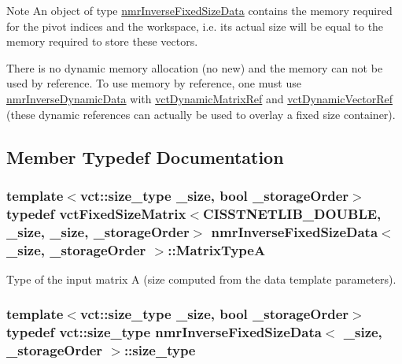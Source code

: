 \begin{DoxyNote}{Note}
An object of type \hyperlink{classnmr_inverse_fixed_size_data}{nmr\+Inverse\+Fixed\+Size\+Data} contains the memory required for the pivot indices and the workspace, i.\+e. its actual size will be equal to the memory required to store these vectors.

There is no dynamic memory allocation (no {\ttfamily new}) and the memory can not be used by reference. To use memory by reference, one must use \hyperlink{classnmr_inverse_dynamic_data}{nmr\+Inverse\+Dynamic\+Data} with \hyperlink{classvct_dynamic_matrix_ref}{vct\+Dynamic\+Matrix\+Ref} and \hyperlink{classvct_dynamic_vector_ref}{vct\+Dynamic\+Vector\+Ref} (these dynamic references can actually be used to overlay a fixed size container). 
\end{DoxyNote}


\subsection{Member Typedef Documentation}
\hypertarget{classnmr_inverse_fixed_size_data_a3ead3c2c221bc42f4717cb0cc0aaa876}{}
\subsubsection[{Matrix\+Type\+A}]{\setlength{\rightskip}{0pt plus 5cm}template$<$vct\+::size\+\_\+type \+\_\+size, bool \+\_\+storage\+Order$>$ typedef {\bf vct\+Fixed\+Size\+Matrix}$<$C\+I\+S\+S\+T\+N\+E\+T\+L\+I\+B\+\_\+\+D\+O\+U\+B\+L\+E, \+\_\+size, \+\_\+size, \+\_\+storage\+Order$>$ {\bf nmr\+Inverse\+Fixed\+Size\+Data}$<$ \+\_\+size, \+\_\+storage\+Order $>$\+::{\bf Matrix\+Type\+A}}\label{classnmr_inverse_fixed_size_data_a3ead3c2c221bc42f4717cb0cc0aaa876}
Type of the input matrix A (size computed from the data template parameters). \hypertarget{classnmr_inverse_fixed_size_data_a45f08ccd7186caa5300f9ff5779e1f76}{}
\subsubsection[{size\+\_\+type}]{\setlength{\rightskip}{0pt plus 5cm}template$<$vct\+::size\+\_\+type \+\_\+size, bool \+\_\+storage\+Order$>$ typedef {\bf vct\+::size\+\_\+type} {\bf nmr\+Inverse\+Fixed\+Size\+Data}$<$ \+\_\+size, \+\_\+storage\+Order $>$\+::{\bf size\+\_\+type}}\label{classnmr_inverse_fixed_size_data_a45f08ccd7186caa5300f9ff5779e1f76}
\hypertarget{classnmr_inverse_fixed_size_data_ac8e0c496927d3fe726116c4c6ddf5af2}{}
